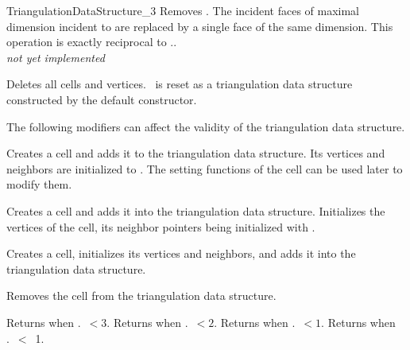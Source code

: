 \begin{ccRefConcept}{TriangulationDataStructure_3}
{Removes . The incident faces of maximal dimension incident to
 are replaced by a single face of the same dimension. This
operation is exactly reciprocal to \ccVar..
\\
\textit{not yet implemented}}

{Deletes all cells and vertices. \ccVar\ is reset as a triangulation
data structure constructed by the default constructor.}


\begin{ccAdvanced}
The following modifiers can affect the validity of the triangulation
data structure.

{Creates a cell and adds it to the triangulation data structure. Its 
vertices and neighbors are initialized to .
The setting functions of the cell can be used later to modify them.}

{Creates a cell and adds it into the triangulation data
structure. Initializes the vertices of the cell, its neighbor pointers 
being initialized with .}

{Creates a cell, initializes its vertices and neighbors, and adds it
into the triangulation data structure.}

{Removes the cell from the triangulation data structure.
}

\end{ccAdvanced}


{Returns  when \ccVar.~$<3$.}
\ccGlue
{}
\ccGlue
{}
{Returns  when \ccVar.~$<2$.}
\ccGlue
{}
\ccGlue
{}
{Returns  when \ccVar.~$<1$.}
\ccGlue
{}
\ccGlue
{}
{Returns  when \ccVar.~$<$~1.}
\ccGlue
{}


\end{ccRefConcept}
